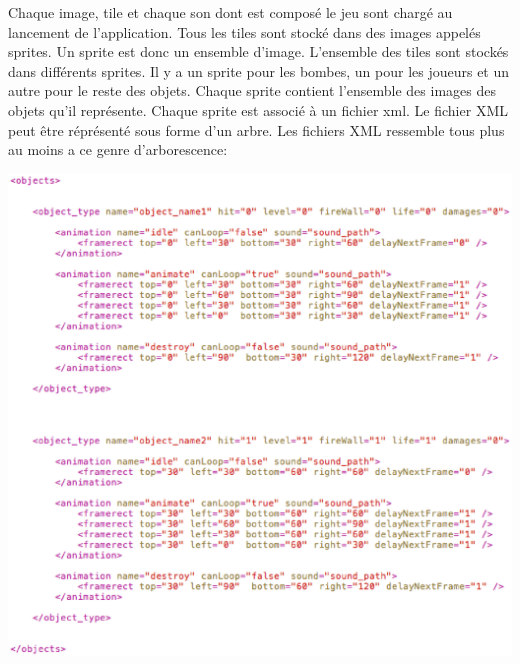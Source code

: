 		Chaque image, tile et chaque son dont est composé le jeu sont chargé au lancement de l'application. Tous les tiles sont stocké dans des images appelés sprites. Un sprite est donc un ensemble d'image. L'ensemble des tiles sont stockés dans différents sprites. Il y a un sprite pour les bombes, un pour les joueurs et un autre pour le reste des objets. Chaque sprite contient l'ensemble des images des objets qu'il représente. Chaque sprite est associé à un fichier \gls{xml}. Le fichier XML peut être réprésenté sous forme d'un arbre. Les fichiers XML ressemble tous plus au moins a ce genre d'arborescence: 
		
		\includegraphics[width=15cm]{./Analyse/Img/exampleXmlBomberklob.eps}
		
